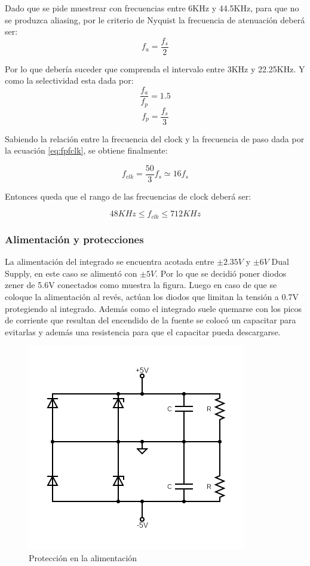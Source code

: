 \documentclass[assd_tp3_main.tex]{subfiles}
\begin{document}
Dado que se pide muestrear con frecuencias entre 6KHz y 44.5KHz, para que no se
produzca aliasing, por le criterio de Nyquist la frecuencia de atenuación deberá ser:
$$ f_{a} = \frac{f_s}{2}$$

Por lo que debería suceder que comprenda el intervalo entre 3KHz y 22.25KHz.
Y como la selectividad esta dada por:
$$\frac{f_a}{f_p}=1.5$$
$$f_p = \frac{f_s}{3}$$


Sabiendo la relación entre la frecuencia del clock y la frecuencia de paso dada por la
ecuación \ref{eq:fpfclk}, se obtiene finalmente:

$$ f_{clk} = \frac{50}{3}f_s \simeq 16f_s$$

Entonces queda que el rango de las frecuencias de clock deberá ser: 

$$ 48KHz \leq f_{clk} \leq 712KHz $$

\subsubsection{Alimentación y protecciones}
La alimentación del integrado se encuentra acotada entre $\pm 2.35V$ y $\pm6V$ Dual Supply,
en este caso se alimentó con $\pm5V$. Por lo que se decidió poner diodos zener de 5.6V
conectados como muestra la figura. Luego en caso de que se coloque la alimentación
al revés, actúan los diodos que limitan la tensión a 0.7V protegiendo al integrado.
Además como el integrado suele quemarse con los picos de corriente que resultan del
encendido de la fuente se colocó un capacitar para evitarlas y además una resistencia
para que el capacitar pueda descargarse. 

\begin{figure}[H]
	\centering
	\includegraphics[width=0.6 \textwidth]
	{images/ej1/proteccion alim.png}
	\caption{Protección en la alimentación}
	\label{fig:pal}
\end{figure}
\end{document}
